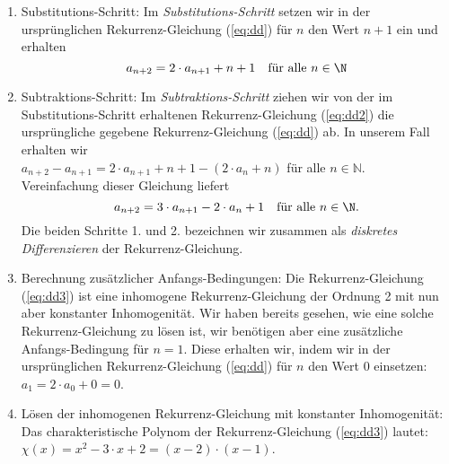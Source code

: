 \begin{enumerate}
\item Substitutions-Schritt: Im \emph{Substitutions-Schritt} setzen wir in der
      urspr\"unglichen Rekurrenz-Gleichung (\ref{eq:dd}) f\"ur $n$ den Wert $n + 1$ ein und
      erhalten 
      \begin{equation}
        \label{eq:dd2}
        a_{n+2} = 2 \cdot a_{n+1} + n + 1 \quad \mbox{f\"ur alle $n \in \N$}
      \end{equation}
\item Subtraktions-Schritt: Im \emph{Subtraktions-Schritt} ziehen wir von der im
      Substitutions-Schritt erhaltenen Rekurrenz-Gleichung (\ref{eq:dd2}) die urspr\"ungliche
      gegebene Rekurrenz-Gleichung (\ref{eq:dd}) ab.  In unserem Fall erhalten wir \\[0.1cm]
      \hspace*{1.3cm} 
      $a_{n+2} - a_{n+1} = 2 \cdot a_{n+1} + n + 1 - \left( 2 \cdot a_n + n \right)$ 
      \quad f\"ur alle $n \in \mathbb{N}$.       \\[0.1cm]
      Vereinfachung dieser Gleichung liefert 
      \begin{equation}
        \label{eq:dd3}
        a_{n+2} = 3 \cdot a_{n+1} - 2 \cdot a_n + 1 \quad \mbox{f\"ur alle $n \in \N$}.
      \end{equation}
      Die beiden Schritte 1. und 2. bezeichnen wir zusammen als 
      \emph{diskretes Differenzieren} der Rekurrenz-Gleichung.
\item Berechnung zus\"atzlicher Anfangs-Bedingungen: Die Rekurrenz-Gleichung (\ref{eq:dd3})
      ist eine inhomogene Rekurrenz-Gleichung der Ordnung 2 mit nun aber konstanter
      Inhomogenit\"at.  Wir haben bereits gesehen, 
      wie eine solche Rekurrenz-Gleichung zu l\"osen ist, wir ben\"otigen aber eine
      zus\"atzliche Anfangs-Bedingung f\"ur $n=1$.  Diese erhalten wir, indem wir in der
      urspr\"unglichen Rekurrenz-Gleichung (\ref{eq:dd}) f\"ur $n$ den Wert 0 einsetzen: \\[0.1cm]
      \hspace*{1.3cm} $a_1 = 2 \cdot a_0 + 0 = 0$.
\item L\"osen der inhomogenen Rekurrenz-Gleichung mit konstanter Inhomogenit\"at:
      Das charakteristische Polynom der Rekurrenz-Gleichung (\ref{eq:dd3}) lautet: \\[0.1cm]
      \hspace*{1.3cm} $\chi(x) = x^2 - 3 \cdot x + 2 = (x - 2) \cdot (x - 1)$. \\[0.1cm]

\end{enumerate}
